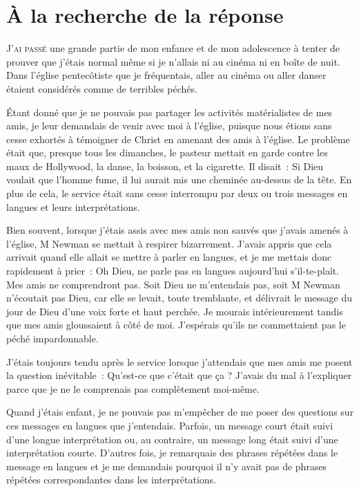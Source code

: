 \chapter{\`A la recherche de la r\'eponse}

\lettrine{J}{'ai passé}
 une grande partie de mon enfance et de mon
 adolescence à tenter de prouver que j'étais normal même si je n'allais ni au
 cinéma ni en boîte de nuit. Dans l'église pentecôtiste que je fréquentais,
 aller au cinéma ou aller danser étaient considérés comme de terribles péchés.

Étant donné que je ne pouvais pas partager les activités matérialistes
 de mes amis, je leur demandais de venir avec moi à l'église,
 puisque nous étions sans cesse exhortés à témoigner de Christ en amenant
 des amis à l'église. Le problème était que, presque tous les dimanches,
 le pasteur mettait en garde contre les
 maux de Hollywood, la danse, la boisson, et la cigarette.
 Il disait~: \og Si Dieu voulait que l'homme fume, il lui aurait mis une
 cheminée au-dessus de la tête.\fg{}
 En plus de cela, le service était sans cesse interrompu par deux ou trois
 \og messages en langues \fg{} et leurs interprétations.

Bien souvent, lorsque j'étais assis avec mes amis non sauvés que j'avais
 amenés à l'église, M Newman se mettait à respirer bizarrement.
 J'avais appris que cela arrivait quand elle allait se mettre à parler en
 langues, et je me mettais donc rapidement à prier~:
 \og Oh Dieu, ne parle pas en langues aujourd'hui s'il-te-plaît.
 Mes amis ne comprendront pas. \fg{}
 Soit Dieu ne m'entendais pas, soit M Newman n'écoutait pas Dieu,
 car elle se levait, toute tremblante, et délivrait le message du jour de Dieu
 d'une voix forte et haut perchée. Je mourais intérieurement tandis que mes amis
 gloussaient à côté de moi. J'espérais qu'ils ne commettaient pas le péché
 impardonnable.

J'étais toujours tendu après le service lorsque j'attendais que mes amis me
 posent la question inévitable~:
 \og Qu'est-ce que c'était que ça ? \fg{}
 J'avais du mal à l'expliquer parce que je ne le comprenais pas complètement
 moi-même.

Quand j'étais enfant, je ne pouvais pas m'empêcher de me poser des questions sur
 ces \og messages en langues \fg{} que j'entendais. Parfois, un message court
 était suivi d'une longue interprétation ou, au contraire, un message long était
 suivi d'une interprétation courte. D'autres fois, je remarquais des phrases
 répétées dans le message en langues et je me demandais pourquoi il n'y avait
 pas de phrases répétées correspondantes dans les interprétations.

